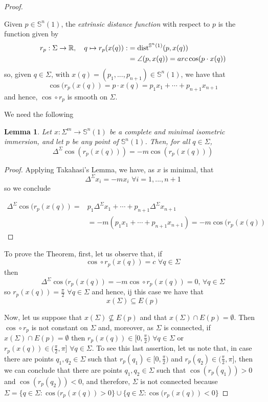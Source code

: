 \documentclass{amsart}
\newtheorem{lemma}[theorem]{Lemma}
\theoremstyle{definition}
\theoremstyle{remark}
\begin{document}
\begin{proof}\

 Given $p\in \mathbb{S}^n(1)$, the \emph{extrinsic distance function} with respect to $p$ is the function given by
$$
\begin{aligned}
r_p:\Sigma \to \mathbb{R}, \quad q\mapsto r_p(x(q)):&={\rm dist}^{\mathbb{S}^n(1)}(p,x(q))\\&=\angle{(p,x(q))}=arc\cos(p\cdot x(q))
\end{aligned}
$$
\noindent  so, given $q \in \Sigma$, with $x(q)=(p_1,...,p_{n+1}) \in \mathbb{S}^n(1)$, we have that
$$
\cos(r_p(x(q))=p\cdot x(q) = p_1x_1+\cdots+p_{n+1}x_{n+1}
$$
 and hence, $\cos\circ r_p$ is smooth on $\Sigma$. 
 
 We need the following
\begin{lemma}\label{coslema}
Let $x:\Sigma^m \to \mathbb{S}^n(1)$ be a complete and minimal isometric immersion, and let $p$ be any point of $\mathbb{S}^n(1)$. Then, for all $q \in \Sigma$,
 \begin{equation}\label{cos}
\Delta^\Sigma \cos(r_p(x(q)))=-m\cos(r_p(x(q)))
\end{equation}
\end{lemma}
\begin{proof}
  Applying Takahasi's Lemma, we have,  as $x$ is minimal, that 
  $$\Delta^\Sigma x_i=-m x_i\,\,\forall i=1,...,n+1$$
  \noindent  so we conclude 

  $$
\begin{aligned}
\Delta^\Sigma \cos(r_p(x(q))=&p_1\Delta^\Sigma x_1+\cdots+p_{n+1}\Delta^\Sigma x_{n+1}\\&=-m\left(p_1x_1+\cdots+p_{n+1}x_{n+1}\right)=-m\cos(r_p(x(q))
\end{aligned}
$$
\end{proof}

 \noindent To prove  the Theorem, first, let us observe that, if 
$$\cos\circ r_p(x(q))=c \,\,\forall q \in \Sigma$$
\noindent then 
$$\Delta^\Sigma \cos(r_p(x(q))=-m\cos\circ r_p(x(q))=0,\,\forall q \in \Sigma$$
\noindent so $r_p(x(q))=\frac{\pi}{2} \,\,\forall q \in \Sigma$ and hence, ij this case we have that $$x(\Sigma) \subseteq E(p)$$

Now,  let us suppose that $x(\Sigma) \not\subseteq E(p)$ and that $x(\Sigma)\cap  E(p)=\emptyset$. Then $\cos\circ r_p$ is not constant on $\Sigma$ and, moreover, as $\Sigma$ is connected,  if $x(\Sigma)\cap  E(p)=\emptyset$ then $r_p(x(q)) \in [0,\frac{\pi}{2})\,\,\forall q \in \Sigma$ or $r_p(x(q)) \in (\frac{\pi}{2},\pi]\,\,\forall q \in \Sigma$. To see this last assertion, let us note that, in case there are points $q_1, q_2 \in \Sigma$ such that $r_p(q_1) \in [0,\frac{\pi}{2})$ and  $r_p(q_2) \in (\frac{\pi}{2},\pi]$, then we can conclude that there are points $q_1, q_2 \in \Sigma$ such that $\cos(r_p(q_1)) >0$ and  $\cos (r_p(q_2)) <0$, and therefore, $\Sigma$ is not connected because $\Sigma=\{ q \in \Sigma: \cos(r_p(x(q)) >0\}\cup \{ q \in \Sigma: \cos(r_p(x(q))< 0\} $


\end{proof}
\end{document}
